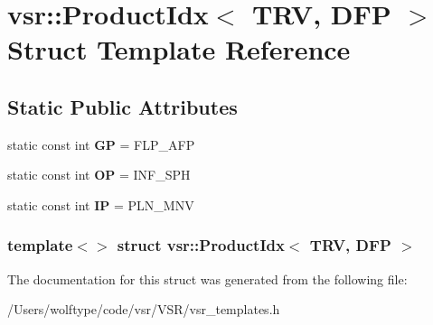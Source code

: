 \hypertarget{structvsr_1_1_product_idx_3_01_t_r_v_00_01_d_f_p_01_4}{\section{vsr\-:\-:Product\-Idx$<$ T\-R\-V, D\-F\-P $>$ Struct Template Reference}
\label{structvsr_1_1_product_idx_3_01_t_r_v_00_01_d_f_p_01_4}
}
\subsection*{Static Public Attributes}
\begin{DoxyCompactItemize}
\item 
\hypertarget{structvsr_1_1_product_idx_3_01_t_r_v_00_01_d_f_p_01_4_a119a87989bbc086b7402a9befbb7d5db}{static const int {\bfseries G\-P} = F\-L\-P\-\_\-\-A\-F\-P}\label{structvsr_1_1_product_idx_3_01_t_r_v_00_01_d_f_p_01_4_a119a87989bbc086b7402a9befbb7d5db}

\item 
\hypertarget{structvsr_1_1_product_idx_3_01_t_r_v_00_01_d_f_p_01_4_af5df2d879bb6f1f989060925cc578de0}{static const int {\bfseries O\-P} = I\-N\-F\-\_\-\-S\-P\-H}\label{structvsr_1_1_product_idx_3_01_t_r_v_00_01_d_f_p_01_4_af5df2d879bb6f1f989060925cc578de0}

\item 
\hypertarget{structvsr_1_1_product_idx_3_01_t_r_v_00_01_d_f_p_01_4_a6a910a4d687a962c751474bd1a8481cd}{static const int {\bfseries I\-P} = P\-L\-N\-\_\-\-M\-N\-V}\label{structvsr_1_1_product_idx_3_01_t_r_v_00_01_d_f_p_01_4_a6a910a4d687a962c751474bd1a8481cd}

\end{DoxyCompactItemize}
\subsubsection*{template$<$$>$ struct vsr\-::\-Product\-Idx$<$ T\-R\-V, D\-F\-P $>$}



The documentation for this struct was generated from the following file\-:\begin{DoxyCompactItemize}
\item 
/\-Users/wolftype/code/vsr/\-V\-S\-R/vsr\-\_\-templates.\-h\end{DoxyCompactItemize}
